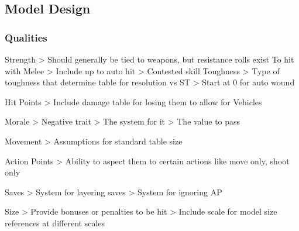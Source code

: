 \begin{multicols*}{2}
	
	\section{Model Design}	
	
	\subsubsection{Qualities}
	
	Strength
	> Should generally be tied to weapons, but resistance rolls exist
	To hit with Melee
	> Include up to auto hit
	> Contested skill
	Toughness
	> Type of toughness that determine table for resolution vs ST
	> Start at 0 for auto wound
	
	Hit Points
	> Include damage table for losing them to allow for Vehicles
	
	Morale
	> Negative trait
	> The system for it
	> The value to pass
	
	Movement
	> Assumptions for standard table size
	
	Action Points
	> Ability to aspect them to certain actions like move only, shoot only
	
	Saves
	> System for layering saves
	> System for ignoring AP
	
	Size
	> Provide bonuses or penalties to be hit
	> Include scale for model size references at different scales
	
	
	
\end{multicols*}